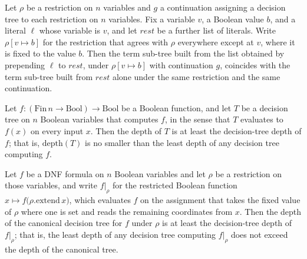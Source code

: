 \begin{lemma}
\label{SwitchingLemma.termSubTree_skip_updated_head}
\leanok
{}
Let $\rho$ be a restriction on $n$ variables and $g$ a continuation assigning a decision
tree to each restriction on $n$ variables. Fix a variable $v$, a Boolean value $b$, and
a literal $\ell$ whose variable is $v$, and let $\mathit{rest}$ be a further list of
literals. Write $\rho[v \mapsto b]$ for the restriction that agrees with $\rho$
everywhere except at $v$, where it is fixed to the value $b$. Then the term sub-tree
built from the list obtained by prepending $\ell$ to $\mathit{rest}$, under $\rho[v
\mapsto b]$ with continuation $g$, coincides with the term sub-tree built from
$\mathit{rest}$ alone under the same restriction and the same continuation.
\end{lemma}

\begin{lemma}
\label{SwitchingLemma.depth_ge_dtDepth}
\leanok
{}
Let $f : (\mathrm{Fin}\,n \to \mathrm{Bool}) \to \mathrm{Bool}$ be a Boolean function,
and let $T$ be a decision tree on $n$ Boolean variables that computes $f$, in the sense
that $T$ evaluates to $f(x)$ on every input $x$. Then the depth of $T$ is at least the
decision-tree depth of $f$; that is, $\mathrm{depth}(T)$ is no smaller than the least
depth of any decision tree computing $f$.
\end{lemma}

\begin{lemma}
\label{SwitchingLemma.canonicalDTree_depth_ge}
\leanok
{}
Let $f$ be a DNF formula on $n$ Boolean variables and let $\rho$ be a restriction on
those variables, and write $f|_\rho$ for the restricted Boolean function $x \mapsto
f\big(\rho.\mathrm{extend}\,x\big)$, which evaluates $f$ on the assignment that takes
the fixed value of $\rho$ where one is set and reads the remaining coordinates from $x$.
Then the depth of the canonical decision tree for $f$ under $\rho$ is at least the
decision-tree depth of $f|_\rho$; that is, the least depth of any decision tree
computing $f|_\rho$ does not exceed the depth of the canonical tree.
\end{lemma}

